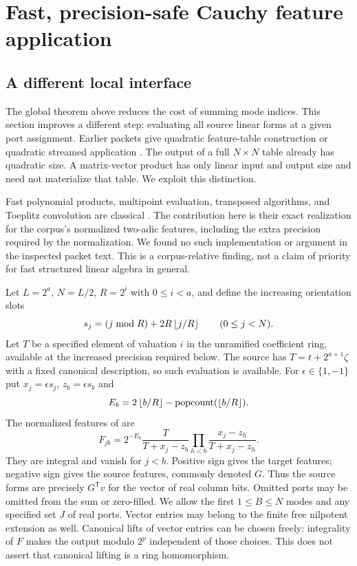 \section{Fast, precision-safe Cauchy feature application}
\label{sec:transforms}

\subsection{A different local interface}
The global theorem above reduces the cost of summing mode indices. This
section improves a different step: evaluating all source linear forms at a
given port assignment. Earlier packets give quadratic feature-table
construction or quadratic streamed application \cite{joint,kernels,cachedtree}.
The output of a full $N\times N$ table already has quadratic size. A
matrix-vector product has only linear input and output size and need not
materialize that table. We exploit this distinction.

Fast polynomial products, multipoint evaluation, transposed algorithms,
and Toeplitz convolution are classical \cite{mca}. The contribution here
is their exact realization for the corpus's normalized two-adic features,
including the extra precision required by the normalization. We found no
such implementation or argument in the inspected packet text. This is a
corpus-relative finding, not a claim of priority for fast structured linear
algebra in general.

Let $L=2^a$, $N=L/2$, $R=2^i$ with $0\le i<a$, and define the
increasing orientation slots
\[
 s_j=(j\bmod R)+2R\left\lfloor j/R\right\rfloor\qquad(0\le j<N).
\]
Let $T$ be a specified element of valuation $i$ in the unramified
coefficient ring, available at the increased precision required below.
The source has $T=t+2^{a+1}\zeta$ with a fixed canonical description, so
such evaluation is available. For $\epsilon\in\{1,-1\}$ put
$x_j=\epsilon s_j$, $z_b=\epsilon s_b$ and
\[
 E_b=2\left\lfloor b/R\right\rfloor-\operatorname{popcount}(\left\lfloor b/R\right\rfloor).
\]
The normalized features of \cite{joint} are
\begin{equation}\label{eq:features}
 F_{jb}=2^{-E_b}\frac{T}{T+x_j-z_b}
             \prod_{h<b}\frac{x_j-z_h}{T+x_j-z_h}.
\end{equation}
They are integral and vanish for $j<b$. Positive sign gives the target
features; negative sign gives the source features, commonly denoted $G$.
Thus the source forms are precisely $G^{\mathsf T}v$ for the vector of
real column bits. Omitted ports may be omitted from the sum or zero-filled.
We allow the first $1\le B\le N$ modes and any specified set $J$ of real ports.
Vector entries may belong to the finite free nilpotent extension as well.
Canonical lifts of vector entries can be chosen freely: integrality of
$F$ makes the output modulo $2^p$ independent of those choices. This does
not assert that canonical lifting is a ring homomorphism.

